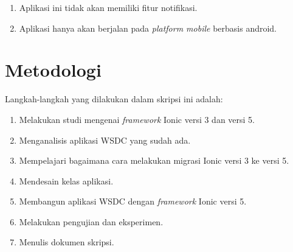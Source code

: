 \begin{enumerate}
    \item Aplikasi ini tidak akan memiliki fitur notifikasi.
    \item Aplikasi hanya akan berjalan pada \textit{platform mobile} berbasis android. 
\end{enumerate}


\section{Metodologi}
\label{sec:metlit}


Langkah-langkah yang dilakukan dalam skripsi ini adalah:

\begin{enumerate}
		\item Melakukan studi mengenai {\it framework} Ionic versi 3 dan versi 5.
		\item Menganalisis aplikasi WSDC yang sudah ada.
		\item Mempelajari bagaimana cara melakukan migrasi Ionic versi 3 ke versi 5.
		\item Mendesain kelas aplikasi.
		\item Membangun aplikasi WSDC dengan {\it framework} Ionic versi 5. 
		\item Melakukan pengujian dan eksperimen.
		\item Menulis dokumen skripsi.
	\end{enumerate}